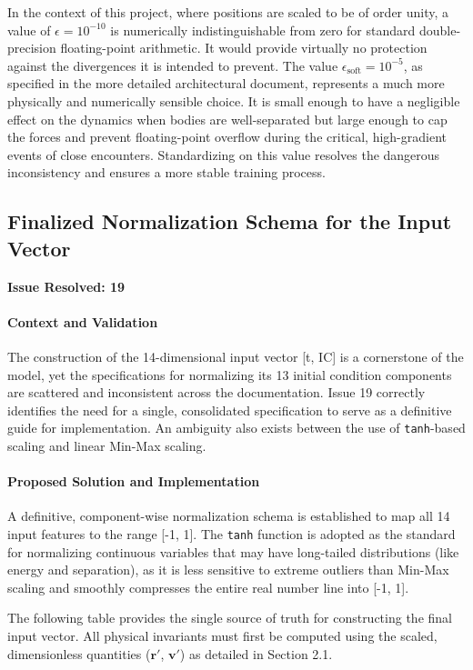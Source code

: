 In the context of this project, where positions are scaled to be of order unity, a value of $\epsilon = 10^{-10}$ is numerically indistinguishable from zero for standard double-precision floating-point arithmetic. It would provide virtually no protection against the divergences it is intended to prevent. The value $\epsilon_{\text{soft}} = 10^{-5}$, as specified in the more detailed architectural document, represents a much more physically and numerically sensible choice. It is small enough to have a negligible effect on the dynamics when bodies are well-separated but large enough to cap the forces and prevent floating-point overflow during the critical, high-gradient events of close encounters. Standardizing on this value resolves the dangerous inconsistency and ensures a more stable training process.

\subsection{Finalized Normalization Schema for the Input Vector}
\textbf{Issue Resolved: 19}
\paragraph{Context and Validation}
The construction of the 14-dimensional input vector [t, IC] is a cornerstone of the model, yet the specifications for normalizing its 13 initial condition components are scattered and inconsistent across the documentation. Issue 19 correctly identifies the need for a single, consolidated specification to serve as a definitive guide for implementation. An ambiguity also exists between the use of \texttt{tanh}-based scaling and linear Min-Max scaling.

\paragraph{Proposed Solution and Imple\-mentation}
A definitive, component-wise normalization schema is established to map all 14 input features to the range [-1, 1]. The \texttt{tanh} function is adopted as the standard for normalizing continuous variables that may have long-tailed distributions (like energy and separation), as it is less sensitive to extreme outliers than Min-Max scaling and smoothly compresses the entire real number line into [-1, 1].

The following table provides the single source of truth for constructing the final input vector. All physical invariants must first be computed using the scaled, dimensionless quantities ($\mathbf{r}'$, $\mathbf{v}'$) as detailed in Section 2.1.

